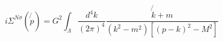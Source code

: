 \begin{equation}
i\Sigma ^{N\sigma }(\not{p})=G^{2}\int_{\Lambda }\frac{d^{4}k}{(2\pi )^{4}}%
\frac{\not{k}+m}{(k^{2}-m^{2})[(p-k)^{2}-M^{2}]}
\end{equation}

